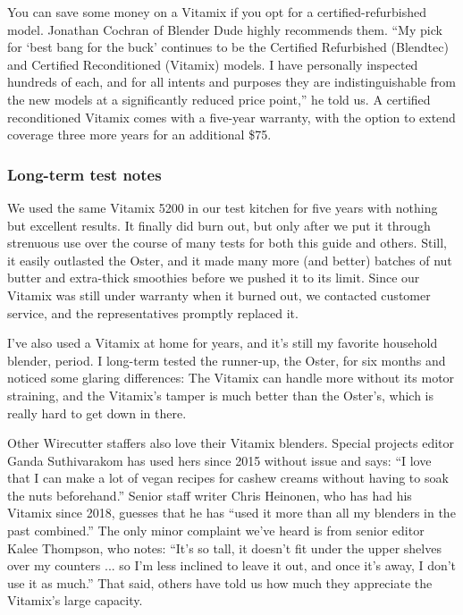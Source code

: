 You can save some money on a Vitamix if you opt for a
certified-refurbished model. Jonathan Cochran of Blender Dude highly
recommends them. ``My pick for `best bang for the buck' continues to be
the Certified Refurbished (Blendtec) and Certified Reconditioned
(Vitamix) models. I have personally inspected hundreds of each, and for
all intents and purposes they are indistinguishable from the new models
at a significantly reduced price point,'' he told us. A certified
reconditioned Vitamix comes with a five-year warranty, with the option
to extend coverage three more years for an additional \$75.

\hypertarget{long-term-test-notes}{%
\subsubsection{Long-term test notes}\label{long-term-test-notes}}

We used the same Vitamix 5200 in our test kitchen for five years with
nothing but excellent results. It finally did burn out, but only after
we put it through strenuous use over the course of many tests for both
this guide and others. Still, it easily outlasted the Oster, and it made
many more (and better) batches of nut butter and extra-thick smoothies
before we pushed it to its limit. Since our Vitamix was still under
warranty when it burned out, we contacted customer service, and the
representatives promptly replaced it.

I've also used a Vitamix at home for years, and it's still my favorite
household blender, period. I long-term tested the runner-up, the Oster,
for six months and noticed some glaring differences: The Vitamix can
handle more without its motor straining, and the Vitamix's tamper is
much better than the Oster's, which is really hard to get down in there.

Other Wirecutter staffers also love their Vitamix blenders. Special
projects editor Ganda Suthivarakom has used hers since 2015 without
issue and says: ``I love that I can make a lot of vegan recipes for
cashew creams without having to soak the nuts beforehand.'' Senior staff
writer Chris Heinonen, who has had his Vitamix since 2018, guesses that
he has ``used it more than all my blenders in the past combined.'' The
only minor complaint we've heard is from senior editor Kalee Thompson,
who notes: ``It's so tall, it doesn't fit under the upper shelves over
my counters ... so I'm less inclined to leave it out, and once it's
away, I don't use it as much.'' That said, others have told us how much
they appreciate the Vitamix's large capacity.

